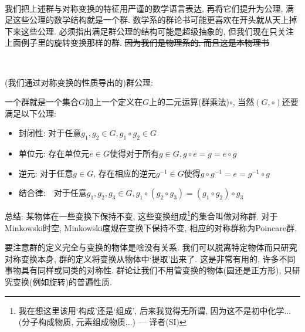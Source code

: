 \ 

我们把上述群与对称变换的特征用严谨的数学语言表达, 再将它们提升为公理, 满足这些公理的数学结构就是一个群. 数学系的群论书可能更喜欢在开头就从天上掉下来这些公理. 必须指出满足群公理的结构可能是超级抽象的, 但我们现在只关注上面例子里的旋转变换那样的群. \sout{因为我们是物理系的, 而且这是本物理书}

\ 

(我们通过对称变换的性质导出的)群公理: 

一个群就是一个集合$G$加上一个定义在$G$上的二元运算(群乘法)$\circ$, 当然$(G, \circ)$还要满足以下公理: 
\begin{itemize}
	\item 封闭性: 对于任意$g_1, g_2 \in G, g_1 \circ g_2 \in G$
	
	\item 单位元: 存在单位元$e \in G$使得对于所有$g \in G, g\circ e = g = e \circ g$
	
	\item 逆元: 对于任意$g \in G$, 存在相应的逆元$g^{-1} \in G$使得$g \circ g^{-1} = e = g^{-1} \circ g$
	
	\item 结合律:　对于任意$g_1, g_2, g_3 \in G, g_1 \circ (g_2 \circ g_3) = (g_1 \circ g_2) \circ g_3$ 
\end{itemize}

总结: 某物体在一些变换下保持不变, 这些变换组成\footnote{我在想这里该用`构成'还是`组成', 后来我觉得无所谓, 因为这不是初中化学...(分子构成物质, 元素组成物质...) --- 译者(SI)}的集合叫做对称群. 对于Minkowski时空, Minkowski度规在变换下保持不变, 相应的对称群称为Poincare群.

要注意群的定义完全与变换的物体是啥没有关系. 我们可以脱离特定物体而只研究对称变换本身, 群的定义将变换从物体中`提取'出来了. 这是非常有用的, 许多不同事物具有同样或同类的对称性. 群论让我们不用管变换的物体(圆还是正方形), 只研究变换(例如旋转)的普遍性质.






